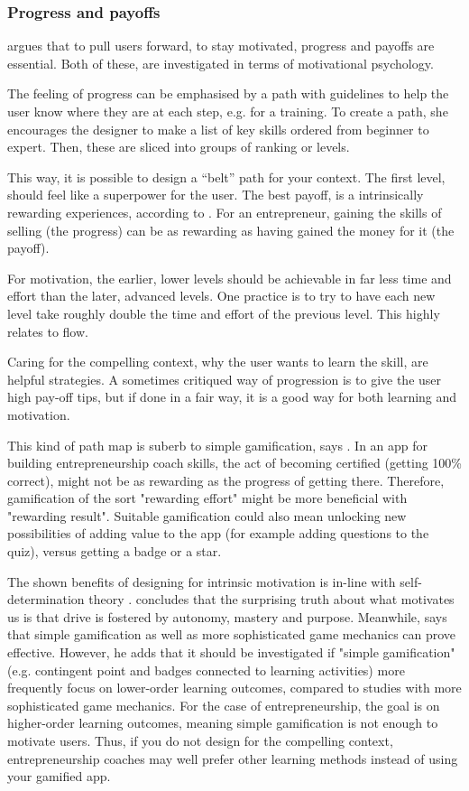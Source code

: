 \subsubsection{Progress and payoffs} \label{progress-payoffs}

\cite{sierra} argues that to pull users forward, to stay motivated, progress and payoffs are essential. Both of these, are investigated in terms of motivational psychology.

The feeling of progress can be emphasised by a path with guidelines to help the user know where they are at each step, e.g. for a training. To create a path, she encourages the designer to make a list of key skills ordered from beginner to expert. Then, these are sliced into groups of ranking or levels.

This way, it is possible to design a “belt” path for your context. The first level, should feel like a superpower for the user. The best payoff, is a intrinsically rewarding experiences, according to \cite{sierra}. For an entrepreneur, gaining the skills of selling (the progress) can be as rewarding as having gained the money for it (the payoff).

For motivation, the earlier, lower levels should be achievable in far less time and effort than the later, advanced levels. One practice is to try to have each new level take roughly double the time and effort of the previous level. This highly relates to flow.

Caring for the compelling context, why the user wants to learn the skill, are helpful strategies. A sometimes critiqued way of progression is to give the user high pay-off tips, but if done in a fair way, it is a good way for both learning and motivation.

This kind of path map is suberb to simple gamification, says \cite{sierra}. In an app for building entrepreneurship coach skills, the act of becoming certified (getting 100\% correct), might not be as rewarding as the progress of getting there. Therefore, gamification of the sort "rewarding effort" might be more beneficial with "rewarding result". Suitable gamification could also mean unlocking new possibilities of adding value to the app (for example adding questions to the quiz), versus getting a badge or a star.

The shown benefits of designing for intrinsic motivation is in-line with self-determination theory \citep{deci, ryan}.  \cite{pink} concludes that the surprising truth about what motivates us is that drive is fostered by autonomy, mastery and purpose. Meanwhile, \cite{gates} says that simple gamification as well as more sophisticated game mechanics can prove effective. However, he adds that it should be investigated if "simple gamification" (e.g. contingent point and badges connected to learning activities) more frequently focus on lower-order learning outcomes, compared to studies with more sophisticated game mechanics. For the case of entrepreneurship, the goal is on higher-order learning outcomes, meaning simple gamification is not enough to motivate users. Thus, if you do not design for the compelling context, entrepreneurship coaches may well prefer other learning methods instead of using your gamified app.
